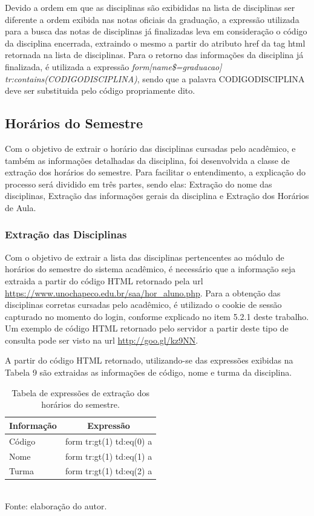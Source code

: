 Devido a ordem em que as disciplinas são exibididas na lista de disciplinas ser diferente a ordem exibida nas notas oficiais da graduação, a expressão utilizada para a busca das notas de disciplinas já finalizadas leva em consideração o código da disciplina encerrada, extraindo o mesmo a partir do atributo href da tag html retornada na lista de disciplinas. Para o retorno das informações da disciplina já finalizada, é utilizada a expressão \emph{form[name\$=graduacao] tr:contains(CODIGODISCIPLINA)}, sendo que a palavra CODIGODISCIPLINA deve ser substituida pelo código propriamente dito.

\subsection{Horários do Semestre}
Com o objetivo de extrair o horário das disciplinas cursadas pelo acadêmico, e também as informações detalhadas da disciplina, foi desenvolvida a classe de extração dos horários do semestre. Para facilitar o entendimento, a explicação do processo será dividido em três partes, sendo elas: Extração do nome das disciplinas, Extração das informações gerais da disciplina e Extração dos Horários de Aula.

\subsubsection{Extração das Disciplinas}
Com o objetivo de extrair a lista das disciplinas pertencentes ao módulo de horários do semestre do sistema acadêmico, é necessário que a informação seja extraida a partir do código HTML retornado pela url \url{https://www.unochapeco.edu.br/saa/hor_aluno.php}. Para a obtenção das disciplinas corretas cursadas pelo acadêmico, é utilizado o cookie de sessão capturado no momento do login, conforme explicado no item 5.2.1 deste trabalho. Um exemplo de código HTML retornado pelo servidor a partir deste tipo de consulta pode ser visto na url \url{http://goo.gl/kz9NN}.

A partir do código HTML retornado, utilizando-se das expressões exibidas na Tabela 9 são extraidas as informações de código, nome e turma da disciplina.

\begin{table}[!hbt]
\centering
\caption[Extração de Informações - Expressões de Extração Horários do Semestre]{Tabela de expressões de extração dos horários do semestre.}
\vspace{3mm}
\begin{tabular}{p{3cm}|c}\hline
\bf{Informação} & \bf{Expressão}           \\ \hline
Código          & form tr:gt(1) td:eq(0) a \\ \hline
Nome            & form tr:gt(1) td:eq(1) a \\ \hline
Turma           & form tr:gt(1) td:eq(2) a \\ \hline
\end{tabular}
\\ Fonte: elaboração do autor.
\end{table}

